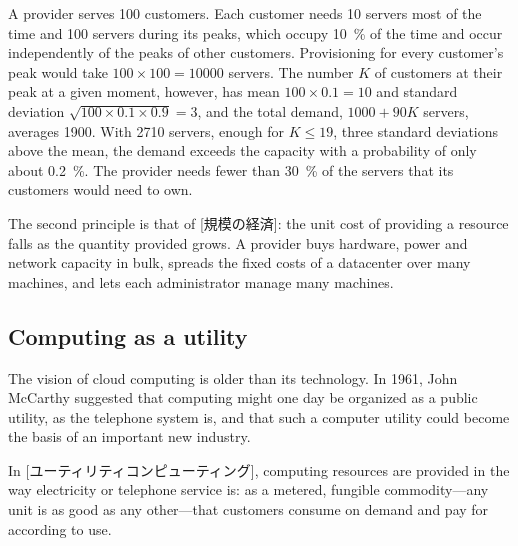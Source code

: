 \documentclass[../main.tex]{subfiles}
\begin{document}
\begin{example}
  A provider serves 100 customers.  Each customer needs 10 servers most of
  the time and 100 servers during its peaks, which occupy \SI{10}{\percent}
  of the time and occur independently of the peaks of other
  customers.
  Provisioning for every customer's peak would take
  $100 \times 100 = \num{10000}$ servers.  The number $K$ of customers at
  their peak at a given moment, however, has mean $100 \times 0.1 = 10$ and
  standard deviation $\sqrt{100 \times 0.1 \times 0.9} = 3$, and the total
  demand, $1000 + 90K$ servers, averages 1900.  With \num{2710} servers,
  enough for $K \le 19$, three standard deviations above the mean, the
  demand exceeds the capacity with a probability of only about
  \SI{0.2}{\percent}.  The provider needs fewer than \SI{30}{\percent} of the
  servers that its customers would need to own.
\end{example}

The second principle is that of [規模の経済]: the
unit cost of providing a resource falls as the quantity provided grows.  A
provider buys hardware, power and network capacity in bulk, spreads the
fixed costs of a datacenter over many machines, and lets each administrator
manage many machines.

\subsection{Computing as a utility}

The vision of cloud computing is older than its technology.  In 1961, John
McCarthy suggested that computing might one day be organized as a public
utility, as the telephone system is, and that such a computer utility could
become the basis of an important new industry.

\begin{definition}
  In [ユーティリティコンピューティング], computing
  resources are provided in the way electricity or telephone service is: as
  a metered, fungible commodity---any unit is as good as any other---that
  customers consume on demand and pay for according to use.
\end{definition}
\end{document}
